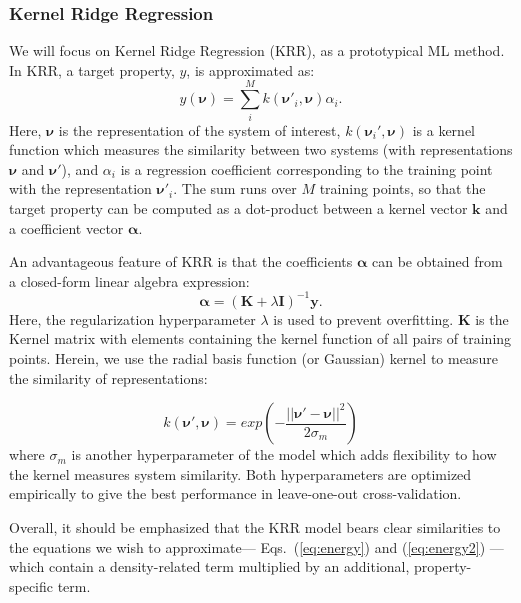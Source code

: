 \subsubsection{Kernel Ridge Regression} \label{krr}
We will focus on Kernel Ridge Regression (KRR), as a prototypical ML method.\cite{Murphy,Rasmussen2006} In KRR, a target property, $y$, is approximated as:
\begin{equation} \label{eq:krr}
y(\boldsymbol{\nu}) = \sum_i^Mk(\boldsymbol{\nu'}_i,\boldsymbol{\nu})\alpha_i.
\end{equation}
Here, $\boldsymbol{\nu}$ is the representation of the system of interest,
$k(\boldsymbol{\nu}_i',\boldsymbol{\nu})$ is a kernel function which measures the similarity between two systems (with representations $\boldsymbol{\nu}$ and $\boldsymbol{\nu'}$), 
and $\alpha_i$ is a regression coefficient corresponding to the training point with the representation $\boldsymbol{\nu'}_i$. The sum runs over $M$ training points, so that the target property can be computed as a dot-product between a kernel vector $\boldsymbol{k}$ and a coefficient vector $\boldsymbol{\alpha}$. 

An advantageous feature of KRR is that the coefficients $\boldsymbol{\alpha}$ can be obtained from a closed-form linear algebra expression:
\begin{equation} \label{eq:alpha}
    \boldsymbol{\alpha} = (\boldsymbol{K} + \lambda\boldsymbol{I})^{-1}\boldsymbol{y}.
\end{equation}
Here, the regularization hyperparameter $\lambda$ is used to prevent overfitting. $\boldsymbol{K}$ is the Kernel matrix with elements containing the kernel function of all pairs of training points. Herein, we use the radial basis function (or Gaussian) kernel to measure the similarity of representations:

 \begin{equation} \label{eq:rbf}
    k(\boldsymbol{\nu'},\boldsymbol{\nu}) = exp\left(-\frac{\lvert\lvert \boldsymbol{\nu'} - \boldsymbol{\nu} \rvert\rvert^2}{2\sigma_m}\right)
\end{equation}
where $\sigma_m$ is another hyperparameter of the model which adds flexibility to how the kernel measures system similarity. Both hyperparameters are optimized empirically to give the best performance in leave-one-out cross-validation.

Overall, it should be emphasized that the KRR model bears clear similarities to the equations we wish to approximate--- Eqs.~(\ref{eq:energy}) and (\ref{eq:energy2}) --- which contain a density-related term multiplied by an additional, property-specific term.

